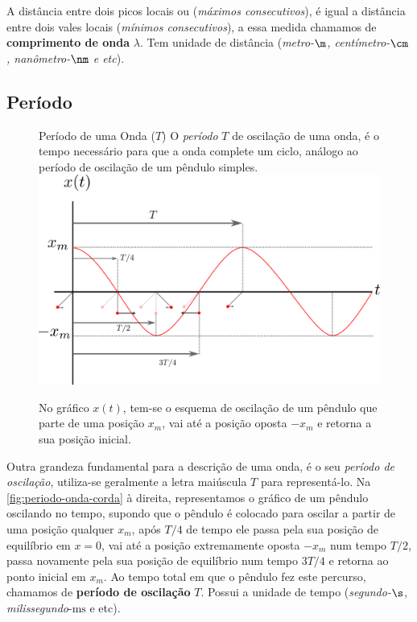 \noindent A distância entre dois picos locais ou (\emph{máximos consecutivos}), é igual a distância entre dois vales locais (\emph{mínimos consecutivos}), a essa medida chamamos de \textbf{comprimento de onda} $\lambda$. Tem unidade de distância (\emph{metro-$\m$, centímetro-$\cm$, nanômetro-$\nm$ e etc}).

       
\subsection*{Período}
\setlength\intextsep{-10pt}
\begin{figure}
    \centering
    \begin{mybox}[colback=white, colframe=deepred,colbacktitle=deepred!85!deepred,]{Período de uma Onda ($T$)}
        O \emph{período} $T$ de oscilação de uma onda, é o tempo necessário para que a onda complete um ciclo, análogo ao período de oscilação de um pêndulo simples.
        \tcblower
        \includegraphics[width=1\textwidth]{img/periodo-1.png}
        \caption{No gráfico $x(t)$, tem-se o esquema de oscilação de um pêndulo que parte de uma posição $x_m$, vai até a posição oposta $-x_m$ e retorna a sua posição inicial.}
        \label{fig:periodo-onda-corda} 
    \end{mybox}            
\end{figure}       
Outra grandeza fundamental para a descrição de uma onda, é o seu \emph{período de oscilação}, utiliza-se geralmente a letra maiúscula $T$ para representá-lo. Na \autoref{fig:periodo-onda-corda} à direita, representamos o gráfico de um pêndulo oscilando no tempo, supondo que o pêndulo é colocado para oscilar a partir de uma posição qualquer $x_m$, após $T/4$ de tempo ele passa pela sua posição de equilíbrio em $x=0$, vai até a posição extremamente oposta $-x_m$ num tempo $T/2$, passa novamente pela sua posição de equilíbrio num tempo $3T/4$ e retorna ao ponto inicial em $x_m$. Ao tempo total em que o pêndulo fez este percurso, chamamos de \textbf{período de oscilação} $T$. Possui a unidade de tempo (\emph{segundo-$\s$}, \emph{milissegundo}-$\mathrm{ms}$ e etc).

